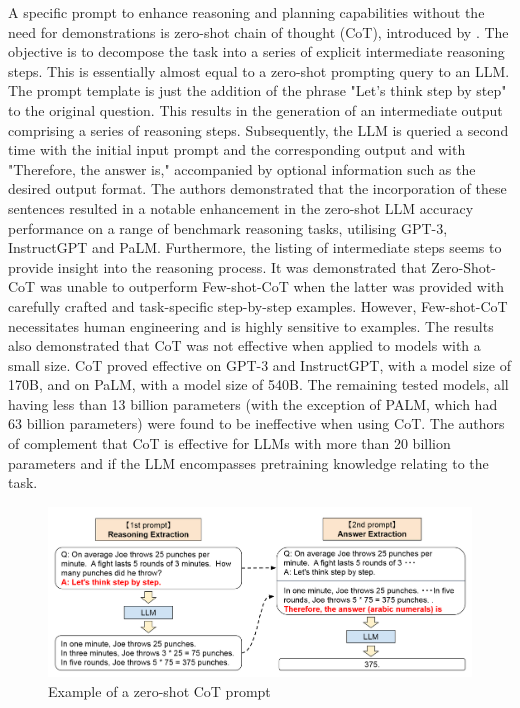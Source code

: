 \documentclass{article}
\begin{document}


A specific prompt to enhance reasoning and planning capabilities without the need for demonstrations is zero-shot chain of thought (CoT), introduced by \cite{kojima_large_2023}. The objective is to decompose the task into a series of explicit intermediate reasoning steps. 
This is essentially almost equal to a zero-shot prompting query to an LLM. The prompt template is just  the addition of the phrase "Let's think step by step" to the original question. This results in the generation of an intermediate output comprising a series of reasoning steps. Subsequently, the LLM is queried a second time with the initial input prompt and the corresponding output and with "Therefore, the answer is," accompanied by optional information such as the desired output format. 
The authors demonstrated that the incorporation of these sentences resulted in a notable enhancement in the zero-shot LLM accuracy performance on a range of benchmark reasoning tasks, utilising GPT-3, InstructGPT and PaLM. Furthermore, the listing of intermediate steps  seems to provide insight into the reasoning process. 
It was demonstrated that Zero-Shot-CoT was unable to outperform Few-shot-CoT when the latter was provided with carefully crafted and task-specific step-by-step examples. However, Few-shot-CoT necessitates human engineering and is highly sensitive to examples. %
The results also demonstrated that CoT was not effective when applied to models with a small size. CoT proved effective on GPT-3 and InstructGPT, with a model size of 170B, and on PaLM, with a model size of 540B. The remaining tested models, all having less than 13 billion parameters (with the exception of PALM, which had 63 billion parameters) were found to be ineffective when using CoT. The authors of \cite{zhang_igniting_2023} complement that  CoT is effective for LLMs with more than 20 billion parameters and if the LLM encompasses pretraining knowledge relating to the task.


\begin{figure}[h]
		\centering
		\includegraphics[width=0.7\linewidth]{ZeroShotCoT.png}
		\caption{Example of a zero-shot CoT prompt \cite{kojima_large_2023}}
		\label{fig:zeroshotcot}
\end{figure}
\end{document}

